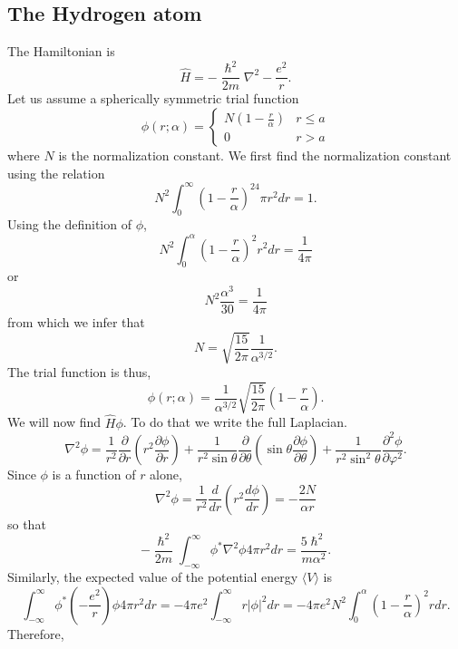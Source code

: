 \documentclass{article}
\numberwithin{equation}{section}
\begin{document}
\subsection{The Hydrogen atom}
The Hamiltonian is
\begin{equation}\label{s5e34}
\hat{H} = -\frac{\hslash^2}{2m}\nabla^2 - \frac{e^2}{r}.
\end{equation}
Let us assume a spherically symmetric trial function
\begin{equation}\label{s5e35}
\phi(r; \alpha) = \begin{cases}
N\left(1 - \frac{r}{\alpha}\right) & r \le a \\
0 & r > a
\end{cases}
\end{equation}
where $N$ is the normalization constant. We first find the normalization 
constant using the relation
\[
N^2\int_0^\infty \left(1 - \frac{r}{\alpha}\right)^24\pi r^2dr = 1.
\]
Using the definition of $\phi$,
\[
N^2\int_0^\alpha\left(1 - \frac{r}{\alpha}\right)^2r^2dr = \frac{1}{4\pi}
\]
or
\[
N^2\frac{\alpha^3}{30} = \frac{1}{4\pi}
\]
from which we infer that
\begin{equation}\label{s5e36}
N = \sqrt{\frac{15}{2\pi}}\frac{1}{\alpha^{3/2}}.
\end{equation}
The trial function is thus,
\begin{equation}\label{s5e37}
\phi(r;\alpha) = \frac{1}{\alpha^{3/2}}\sqrt{\frac{15}{2\pi}}
\left(1-\frac{r}{\alpha}\right).
\end{equation}
We will now find $\hat{H}\phi$. To do that we write the full Laplacian.
\[
\nabla^2\phi = \frac{1}{r^2}\frac{\partial}{\partial r}\left(r^2\frac{
\partial\phi}{\partial r}\right) + \frac{1}{r^2\sin\theta}\frac{\partial}
{\partial\theta}\left(\sin\theta\frac{\partial\phi}{\partial\theta}
\right)+\frac{1}{r^2\sin^2\theta}\frac{\partial^2\phi}{\partial\varphi^2}.
\]
Since $\phi$ is a function of $r$ alone,
\[
\nabla^2\phi = \frac{1}{r^2}\frac{d}{dr}\left(r^2\frac{d\phi}{dr}\right)
= -\frac{2N}{\alpha r}
\]
so that
\begin{equation}\label{s5e38}
-\frac{\hslash^2}{2m}\int_{-\infty}^\infty\phi^\ast\nabla^2\phi 4\pi r^2dr
= \frac{5\hslash^2}{m\alpha^2}.
\end{equation}
Similarly, the expected value of the potential energy $\langle V \rangle$ is
\[
\int_{-\infty}^\infty\phi^\ast\left(-\frac{e^2}{r}\right)\phi 4\pi r^2dr = 
-4\pi e^2\int_{-\infty}^\infty r|\phi|^2dr = -4\pi e^2N^2\int_0^\alpha
\left(1 - \frac{r}{\alpha}\right)^2 r dr.
\]
Therefore,
\end{document}
